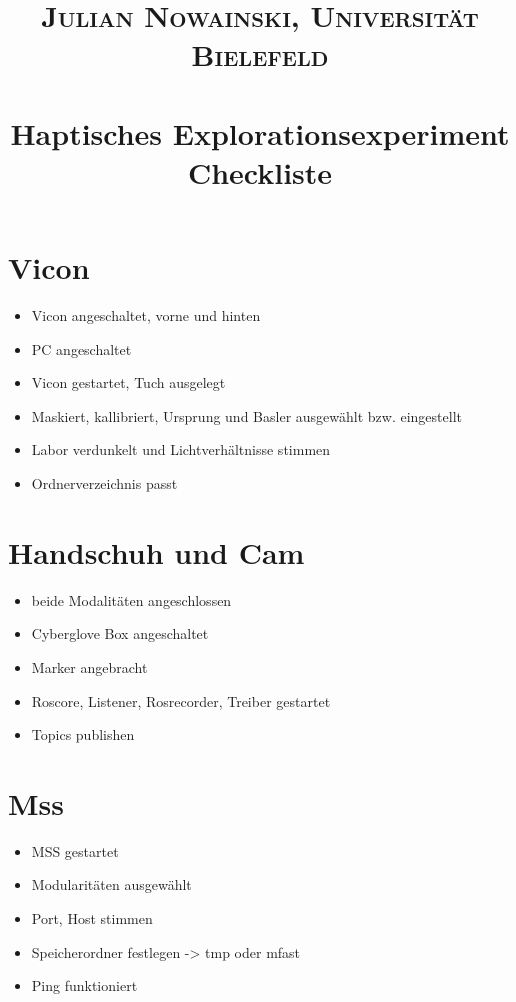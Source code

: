 \documentclass[paper=a4, fontsize=11pt]{scrartcl} %
\title{	
	\normalfont \normalsize 
	\textsc{Julian Nowainski, Universität Bielefeld} \\ [5pt] %
	\horrule{0.5pt} \\[0.4cm] %
	\huge Haptisches Explorationsexperiment \\ %
	\large Checkliste
	\horrule{2pt} \\[0.5cm] %
	\date{\vspace{-10ex}} %
}
\numberwithin{equation}{section} %
\numberwithin{figure}{section} %
\numberwithin{table}{section} %
\begin{document}
	
	\maketitle %
	
	
	\section{Vicon}
	\begin{itemize}
		\item Vicon angeschaltet, vorne und hinten
		\item PC angeschaltet
		\item Vicon gestartet, Tuch ausgelegt
		\item Maskiert, kallibriert, Ursprung und Basler ausgewählt bzw. eingestellt
		\item Labor verdunkelt und Lichtverhältnisse stimmen
		\item Ordnerverzeichnis passt
	\end{itemize}
	
	
	
	\section{Handschuh und Cam}
	
	\begin{itemize}
		\item beide Modalitäten angeschlossen
		\item Cyberglove Box angeschaltet
		\item Marker angebracht
		\item Roscore, Listener, Rosrecorder, Treiber gestartet
		\item Topics publishen 
	\end{itemize}
	
	
	
	\section{Mss}
	\begin{itemize}
		\item MSS gestartet
		\item Modularitäten ausgewählt
		\item Port, Host stimmen
		\item Speicherordner festlegen -> tmp oder mfast
		\item Ping funktioniert
	\end{itemize}
\end{document}

